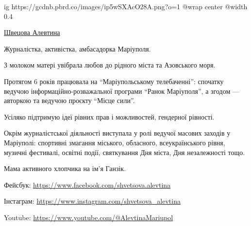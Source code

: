  
 
 
 
 

\ifcmt
  ig https://gcdnb.pbrd.co/images/ip5wSXAcO28A.png?o=1
  @wrap center
  @width 0.4
\fi

\href{https://donbas24.news/author/alevtina-svecova}{Швецова Алевтина}

Журналістка, активістка, амбасадорка Маріуполя.

З молоком матері увібрала любов до рідного міста та Азовського моря.

Протягом 6 років працювала на \enquote{Маріупольському телебаченні}: спочатку ведучою
інформаційно-розважальної програми \enquote{Ранок Маріуполя}, а згодом — авторкою та
ведучою проєкту \enquote{Місце сили}.

Усіляко підтримую ідеї рівних прав і можливостей, гендерної рівності.

Окрім журналістської діяльності виступала у ролі ведучої масових заходів у
Маріуполі: спортивні змагання міського, обласного, всеукраїнського рівня,
музичні фестивалі, освітні події, святкування Дня міста, Дня незалежності тощо.

Мама активного хлопчика на ім'я Ганзік.

Фейсбук: \url{https://www.facebook.com/shvetsova.alevtina}\par
Інстаграм: \url{https://www.instagram.com/shvetsova_alevtina}\par
Youtube: \url{https://www.youtube.com/@AlevtinaMariupol}
